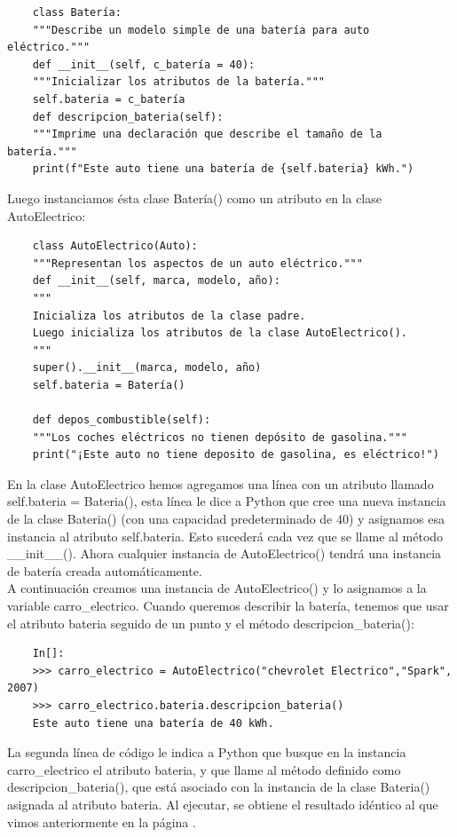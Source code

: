 {\begin{lstlisting}
	class Batería:
	"""Describe un modelo simple de una batería para auto eléctrico."""
	def __init__(self, c_batería = 40):
	"""Inicializar los atributos de la batería."""
	self.bateria = c_batería
	def descripcion_bateria(self):
	"""Imprime una declaración que describe el tamaño de la batería."""        
	print(f"Este auto tiene una batería de {self.bateria} kWh.")
\end{lstlisting}

Luego instanciamos ésta clase {\ttfamily Batería()} como un atributo en la clase {\ttfamily AutoElectrico}:


\begin{lstlisting}
	class AutoElectrico(Auto):
	"""Representan los aspectos de un auto eléctrico."""
	def __init__(self, marca, modelo, año):
	"""
	Inicializa los atributos de la clase padre.
	Luego inicializa los atributos de la clase AutoElectrico().
	"""
	super().__init__(marca, modelo, año)
	self.bateria = Batería()
	
	def depos_combustible(self):
	"""Los coches eléctricos no tienen depósito de gasolina."""        
	print("¡Este auto no tiene deposito de gasolina, es eléctrico!")
\end{lstlisting}


En la clase {\ttfamily AutoElectrico} hemos agregamos una línea con un atributo llamado {\ttfamily self.bateria = Bateria()}, esta línea le dice a Python que cree una nueva instancia de la clase {\ttfamily Bateria()} (con una capacidad predeterminado de 40) y asignamos esa instancia al atributo {\ttfamily self.bateria}. Esto sucederá cada vez que  se llame al método {\ttfamily \_\!\!\_init\_\!\!\_()}. Ahora cualquier instancia de {\ttfamily AutoElectrico()}  tendrá una instancia de batería creada automáticamente.\\

A continuación creamos una instancia de {\ttfamily AutoElectrico()}  y lo asignamos a la variable {\ttfamily carro\_electrico}. Cuando queremos describir la batería, tenemos que usar el atributo {\ttfamily bateria} seguido de un punto y el método {\ttfamily descripcion\_bateria()}:

\begin{lstlisting}
	In[]:
	>>> carro_electrico = AutoElectrico("chevrolet Electrico","Spark", 2007)	
	>>> carro_electrico.bateria.descripcion_bateria()
	Este auto tiene una batería de 40 kWh.
\end{lstlisting}La segunda línea de código le indica a Python que busque en la instancia  {\ttfamily carro\_electrico} el atributo {\ttfamily bateria}, y que llame al método definido como {\ttfamily descripcion\_bateria()}, que está asociado con la instancia de la clase {\ttfamily Bateria()} asignada al atributo {\ttfamily bateria}. Al ejecutar, se obtiene el resultado  idéntico al que vimos anteriormente en la página \pageref{bateria40}.\\




}
